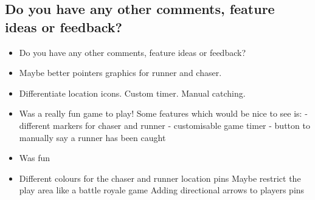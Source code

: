 \documentclass{l4proj}
\begin{document}
\begin{appendices}
\section{Do you have any other comments, feature ideas or feedback?}
\label{phase1comments}

\begin{itemize}
    \item Do you have any other comments, feature ideas or feedback?
    \item Maybe better pointers graphics for runner and chaser.
    \item Differentiate location icons. Custom timer. Manual catching.
    \item Was a really fun game to play! Some features which would be nice to see is: - different markers for chaser and runner - customisable game timer - button to manually say a runner has been caught
    \item Was fun
    \item 	Different colours for the chaser and runner location pins Maybe restrict the play area like a battle royale game Adding directional arrows to players pins
\end{itemize}


\end{appendices}
\end{document}
